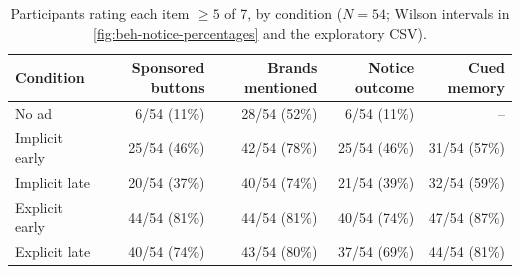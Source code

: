 \begin{table}[H]
\centering
\small
\caption{Participants rating each item \(\geq 5\) of 7, by condition (\(N=54\); Wilson intervals in \autoref{fig:beh-notice-percentages} and the exploratory CSV).}
\label{tab:beh-notice-percentages}
\begin{tabular}{@{}l r r r r@{}}
\toprule
Condition & Sponsored buttons & Brands mentioned & Notice outcome & Cued memory \\
\midrule
No ad & 6/54 (11\%) & 28/54 (52\%) & 6/54 (11\%) & -- \\
\midrule
Implicit early & 25/54 (46\%) & 42/54 (78\%) & 25/54 (46\%) & 31/54 (57\%) \\
Implicit late & 20/54 (37\%) & 40/54 (74\%) & 21/54 (39\%) & 32/54 (59\%) \\
Explicit early & 44/54 (81\%) & 44/54 (81\%) & 40/54 (74\%) & 47/54 (87\%) \\
Explicit late & 40/54 (74\%) & 43/54 (80\%) & 37/54 (69\%) & 44/54 (81\%) \\
\bottomrule
\end{tabular}
\end{table}

